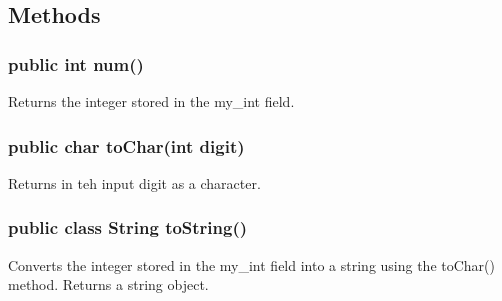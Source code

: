 \begin{homeworkProblem}
    \subsection{Methods}
    \subsubsection{public int num()}
    Returns the integer stored in the my_int field.
    \subsubsection{public char toChar(int digit)}
    Returns in teh input digit as a character.
    \subsubsection{public class String toString()}
    Converts the integer stored in the my_int field into a string using the toChar() method. Returns a string object.
\end{homeworkProblem}
